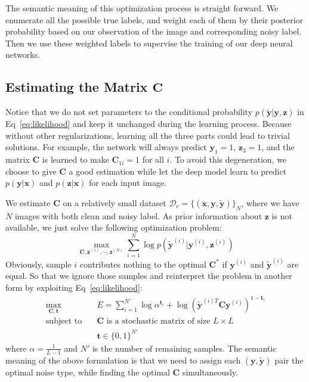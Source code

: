 \documentclass[10pt,twocolumn,letterpaper]{article}
\def\vec{\mathbf}
\def\mat{\mathbf}
\begin{document}
The semantic meaning of this optimization process is straight forward. We enumerate all the possible true labels, and weight each of them by their posterior probability based on our observation of the image and corresponding noisy label. Then we use these weighted labels to supervise the training of our deep neural networks.

\subsection{Estimating the Matrix $\mat{C}$} %
\label{sub:confusion_estimation}
Notice that we do not set parameters to the conditional probability $p(\tilde{\vec{y}}|\vec{y},\vec{z})$ in Eq~\eqref{eq:likelihood} and keep it unchanged during the learning process. Because without other regularizations, learning all the three parts could lead to trivial solutions. For example, the network will always predict $\vec{y}_1 = 1$, $\vec{z}_3 = 1$, and the matrix $\mat{C}$ is learned to make $\mat{C}_{1i} = 1$ for all $i$. To avoid this degeneration, we choose to give $\mat{C}$ a good estimation while let the deep model learn to predict $p(\vec{y} | \vec{x})$ and $p(\vec{z} | \vec{x})$ for each input image.

We estimate $\mat{C}$ on a relatively small dataset $\mathcal{D}_c = \{(\vec{x},\vec{y},\tilde{\vec{y}})\}_N$, where we have $N$ images with both clean and noisy label. As prior information about $\vec{z}$ is not available, we just solve the following optimization problem:
\begin{equation}
    \max_{\mat{C},\vec{z}^{(1)},\cdots,\vec{z}^{(N)}} \sum_{i=1}^N \log p(\tilde{\vec{y}}^{(i)}|\vec{y}^{(i)},\vec{z}^{(i)})
\end{equation}
Obviously, sample $i$ contributes nothing to the optimal $\mat{C}^*$ if $\vec{y}^{(i)}$ and $\tilde{\vec{y}}^{(i)}$ are equal. So that we ignore those samples and reinterpret the problem in another form by exploiting Eq~\ref{eq:likelihood}:
\begin{equation}
\begin{aligned}
\max_{\mat{C},\vec{t}} \quad & E=\sum_{i=1}^{N'} \log \alpha^{\vec{t}_i} + \log (\tilde{\vec{y}}^{(i)T} \mat{C} \vec{y}^{(i)})^{1-\vec{t}_i}\\
\text{subject to} \quad & \mat{C} \text{ is a stochastic matrix of size } L\times L \\
                    & \vec{t} \in \{0,1\}^{N'}
\end{aligned}
\end{equation}
where $\alpha=\frac{1}{L-1}$ and $N'$ is the number of remaining samples. The semantic meaning of the above formulation is that we need to assign each $(\vec{y},\tilde{\vec{y}})$ pair the optimal noise type, while finding the optimal $\mat{C}$ simultaneously.
\end{document}
